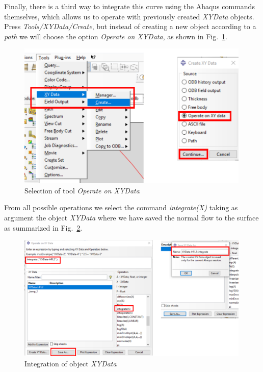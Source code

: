 \begin{itemize}
  Finally, there is a third way to integrate this curve using the Abaqus commands themselves, which allows us to operate with previously created \textit{XYData} objects. Press \textit{Tools/XYData/Create}, but instead of creating a new object according to a \textit{path} we will choose the option \textit{Operate on XYData}, as shown in Fig.~\ref{post26c}.
   \begin{figure}[!h]
    \begin{center}
      \includegraphics[width=0.99\textwidth]{./body/images/post26c.pdf}
    \end{center}
    \caption{Selection of tool \textit{Operate on XYData}}
    \label{post26c}
  \end{figure}

  From all possible operations we select the command \textit{integrate(X)} taking as argument the object \textit{XYData} where we have saved the normal flow to the surface as summarized in Fig.~\ref{post26d}.
    \begin{figure}[!h]
    \begin{center}
      \includegraphics[width=0.99\textwidth]{./body/images/post26d.pdf}
    \end{center}
    \caption{Integration of object \textit{XYData}}
    \label{post26d}
  \end{figure}


\end{itemize}
